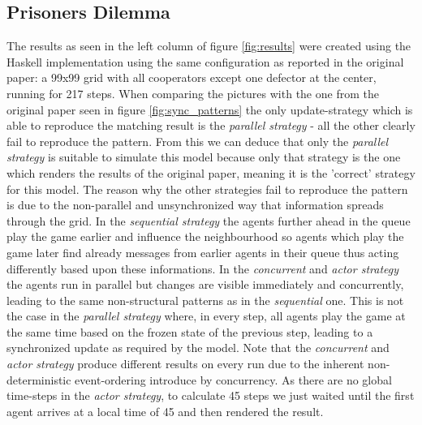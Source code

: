 \subsection{Prisoners Dilemma}
The results as seen in the left column of figure \ref{fig:results} were created using the Haskell implementation using the same configuration as reported in the original paper: a 99x99 grid with all cooperators except one defector at the center, running for 217 steps. When comparing the pictures with the one from the original paper seen in figure \ref{fig:sync_patterns} the only update-strategy which is able to reproduce the matching result is the \textit{parallel strategy} - all the other clearly fail to reproduce the pattern. From this we can deduce that only the \textit{parallel strategy} is suitable to simulate this model because only that strategy is the one which renders the results of the original paper, meaning it is the 'correct' strategy for this model. The reason why the other strategies fail to reproduce the pattern is due to the non-parallel and unsynchronized way that information spreads through the grid. In the \textit{sequential strategy} the agents further ahead in the queue play the game earlier and influence the neighbourhood so agents which play the game later find already messages from earlier agents in their queue thus acting differently based upon these informations. In the \textit{concurrent} and \textit{actor strategy} the agents run in parallel but changes are visible immediately and concurrently, leading to the same non-structural patterns as in the \textit{sequential} one. This is not the case in the \textit{parallel strategy}  where, in every step, all agents play the game at the same time based on the frozen state of the previous step, leading to a synchronized update as required by the model. Note that the \textit{concurrent} and \textit{actor strategy} produce different results on every run due to the inherent non-deterministic event-ordering introduce by concurrency. As there are no global time-steps in the \textit{actor strategy}, to calculate 45 steps we just waited until the first agent arrives at a local time of 45 and then rendered the result.

